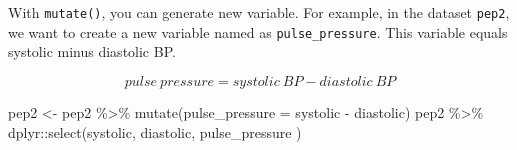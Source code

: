 \documentclass[
  10pt,
]{krantz}
\newenvironment{Shaded}{\begin{snugshade}}{\end{snugshade}}
\newcommand{\AttributeTok}[1]{\textcolor[rgb]{0.77,0.63,0.00}{#1}}
\newcommand{\FunctionTok}[1]{\textcolor[rgb]{0.00,0.00,0.00}{#1}}
\newcommand{\NormalTok}[1]{#1}
\newcommand{\OtherTok}[1]{\textcolor[rgb]{0.56,0.35,0.01}{#1}}
\newcommand{\SpecialCharTok}[1]{\textcolor[rgb]{0.00,0.00,0.00}{#1}}
\begin{document}
With \texttt{mutate()}, you can generate new variable. For example, in the dataset \texttt{pep2}, we want to create a new variable named as \texttt{pulse\_pressure}. This variable equals systolic minus diastolic BP.

\[pulse \: pressure = systolic \: BP - diastolic \: BP \]

\begin{Shaded}
\begin{Highlighting}[]
\NormalTok{pep2 }\OtherTok{\textless{}{-}}\NormalTok{ pep2 }\SpecialCharTok{\%\textgreater{}\%} \FunctionTok{mutate}\NormalTok{(}\AttributeTok{pulse\_pressure =}\NormalTok{ systolic }\SpecialCharTok{{-}}\NormalTok{ diastolic)}
\NormalTok{pep2 }\SpecialCharTok{\%\textgreater{}\%}\NormalTok{ dplyr}\SpecialCharTok{::}\FunctionTok{select}\NormalTok{(systolic, diastolic, pulse\_pressure )}
\end{Highlighting}
\end{Shaded}
\end{document}
